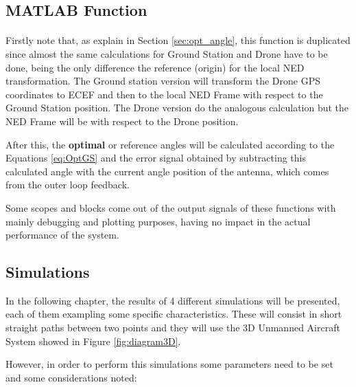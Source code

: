 \subsection*{MATLAB Function}
\paragraph{}Firstly note that, as explain in Section \ref{sec:opt_angle}, this function is duplicated since almost the same calculations for Ground Station and Drone have to be done, being the only difference the reference (origin) for the local NED transformation.
The Ground station version will transform the Drone GPS coordinates to ECEF and then to the local NED Frame with respect to the Ground Station position. The Drone version do the analogous calculation but the NED Frame will be with respect to the Drone position.

After this, the \textbf{optimal} or {reference} angles will be calculated according to the Equations \ref{eq:OptGS} and the error signal obtained by subtracting this calculated angle with the current angle position of the antenna, which comes from the outer loop feedback.

Some scopes and blocks come out of the output signals of these functions with mainly debugging and plotting purposes, having no impact in the actual performance of the system. 

\subsection*{Simulations}

In the following chapter, the results of 4 different simulations will be presented, each of them exampling some specific characteristics. These will consist in short straight paths between two points and they will use the 3D Unmanned Aircraft System showed in Figure \ref{fig:diagram3D}.

However, in order to perform this simulations some parameters need to be set and some considerations noted:

